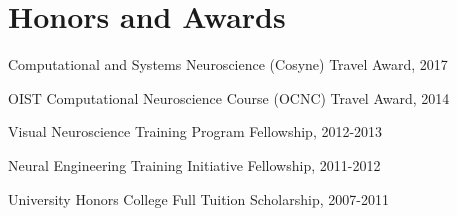 \documentclass[10pt,letterpaper]{article}
\renewenvironment{itemize}{
  \begin{list}{}{
    \setlength{\leftmargin}{1.5em}
    \setlength{\itemsep}{0.25em}
    \setlength{\parskip}{0pt}
    \setlength{\parsep}{0.25em}
  }
}{
  \end{list}
}
\begin{document}
\vspace{-0.25in}

\section*{Honors and Awards}
\vspace{-0.05in}
\begin{itemize}
  \setlength\itemsep{1pt}
  \item Computational and Systems Neuroscience (Cosyne) Travel Award, 2017
  \item OIST Computational Neuroscience Course (OCNC) Travel Award, 2014
  \item Visual Neuroscience Training Program Fellowship, 2012-2013
  \item Neural Engineering Training Initiative Fellowship, 2011-2012
  \item University Honors College Full Tuition Scholarship, 2007-2011
\end{itemize}

\vspace{-0.25in}
\end{document}
